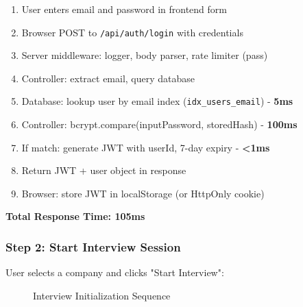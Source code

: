 \documentclass[12pt,a4paper,oneside]{article}
\begin{document}
\begin{enumerate}
    \item User enters email and password in frontend form
    \item Browser POST to \texttt{/api/auth/login} with credentials
    \item Server middleware: logger, body parser, rate limiter (pass)
    \item Controller: extract email, query database
    \item Database: lookup user by email index (\texttt{idx\_users\_email}) - \textbf{5ms}
    \item Controller: bcrypt.compare(inputPassword, storedHash) - \textbf{100ms}
    \item If match: generate JWT with userId, 7-day expiry - \textbf{<1ms}
    \item Return JWT + user object in response
    \item Browser: store JWT in localStorage (or HttpOnly cookie)
\end{enumerate}

\textbf{Total Response Time: \textbf{105ms}}

\subsubsection{Step 2: Start Interview Session}

User selects a company and clicks "Start Interview":

\begin{figure}[H]
\centering
{}
\caption{Interview Initialization Sequence}
\label{fig:interview-init}
\end{figure}
\end{document}
